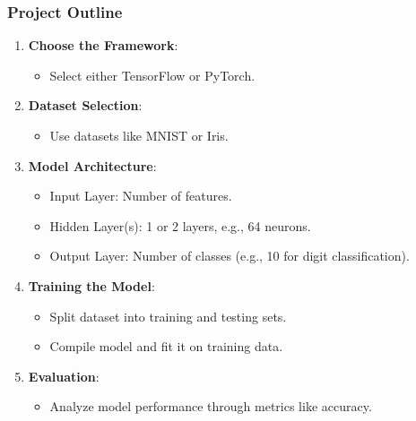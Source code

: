 \documentclass[aspectratio=169]{beamer}
\begin{document}
\begin{frame}[fragile]
    \frametitle{Project Outline}
    \begin{enumerate}
        \item \textbf{Choose the Framework}:
        \begin{itemize}
            \item Select either TensorFlow or PyTorch.
        \end{itemize}

        \item \textbf{Dataset Selection}:
        \begin{itemize}
            \item Use datasets like MNIST or Iris.
        \end{itemize}
        
        \item \textbf{Model Architecture}:
        \begin{itemize}
            \item Input Layer: Number of features.
            \item Hidden Layer(s): 1 or 2 layers, e.g., 64 neurons.
            \item Output Layer: Number of classes (e.g., 10 for digit classification).
        \end{itemize}
        
        \item \textbf{Training the Model}:
        \begin{itemize}
            \item Split dataset into training and testing sets.
            \item Compile model and fit it on training data.
        \end{itemize}
        
        \item \textbf{Evaluation}:
        \begin{itemize}
            \item Analyze model performance through metrics like accuracy.
        \end{itemize}
    \end{enumerate}
\end{frame}
\end{document}
